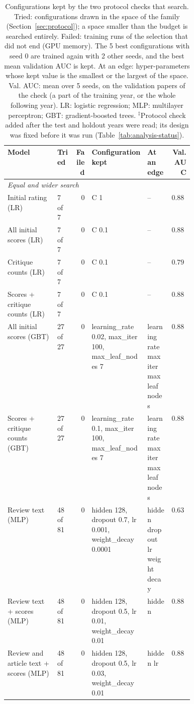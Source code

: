 \begin{table}[t]
\centering
\footnotesize
\setlength{\tabcolsep}{3pt}
\caption{Configurations kept by the two protocol checks that search. Tried: configurations drawn in the space of the family (Section~\ref{sec:protocol}); a space smaller than the budget is searched entirely. Failed: training runs of the selection that did not end (GPU memory). The 5 best configurations with seed 0 are trained again with 2 other seeds, and the best mean validation AUC is kept. At an edge: hyper-parameters whose kept value is the smallest or the largest of the space. Val. AUC: mean over 5 seeds, on the validation papers of the check (a part of the training year, or the whole following year). LR: logistic regression; MLP: multilayer perceptron; GBT: gradient-boosted trees. $^{\ddagger}$Protocol check added after the test and holdout years were read; its design was fixed before it was run (Table~\ref{tab:analysis-status}).}
\label{tab:protocol-configurations}
\begin{tabular}{@{}llr>{\raggedright\arraybackslash}p{0.30\linewidth}>{\raggedright\arraybackslash}p{0.13\linewidth}r@{}}
\toprule
Model & Tried & Failed & Configuration kept & At an edge & Val. AUC \\
\midrule
\multicolumn{6}{l}{\emph{Equal and wider search}} \\
Initial rating (LR) & 7 of 7 & 0 & C 1 & -- & $0.880$ \\
All initial scores (LR) & 7 of 7 & 0 & C 0.1 & -- & $0.884$ \\
Critique counts (LR) & 7 of 7 & 0 & C 0.1 & -- & $0.791$ \\
Scores + critique counts (LR) & 7 of 7 & 0 & C 0.1 & -- & $0.889$ \\
All initial scores (GBT) & 27 of 27 & 0 & learning\_rate 0.02, max\_iter 100, max\_leaf\_nodes 7 & learning rate max iter max leaf nodes & $0.882$ \\
Scores + critique counts (GBT) & 27 of 27 & 0 & learning\_rate 0.1, max\_iter 100, max\_leaf\_nodes 7 & learning rate max iter max leaf nodes & $0.889$ \\
Review text (MLP) & 48 of 81 & 0 & hidden 128, dropout 0.7, lr 0.001, weight\_decay 0.0001 & hidden dropout lr weight decay & $0.632$ \\
Review text + scores (MLP) & 48 of 81 & 0 & hidden 128, dropout 0.5, lr 0.01, weight\_decay 0.01 & hidden & $0.887$ \\
Review and article text + scores (MLP) & 48 of 81 & 0 & hidden 128, dropout 0.5, lr 0.03, weight\_decay 0.01 & hidden lr & $0.887$ \\

\end{tabular}
\end{table}
